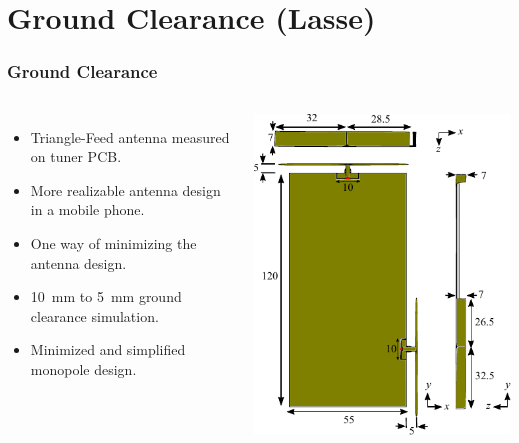 \section[Ground Clearance]{Ground Clearance (Lasse)}
\def\legendfooter{\scriptsize{Upper: Top antenna. Lower: Side antenna. \textcolor{bb}{Monopole Sim}, \textcolor{gg}{Monopole Meas}, \textcolor{rr}{Triangle-Feed Meas}, Frequency in MHz.}}
\def\emptyline{\textcolor{white}{Empty}}

\begin{frame}[fragile]
  \frametitle{Ground Clearance}
  \begin{columns}[onlytextwidth,t]
      \begin{itemize}
      \item Triangle-Feed antenna measured on tuner PCB.
      \item More realizable antenna design in a mobile phone.
      \item One way of minimizing the antenna design.
      \item \SI{10}{mm} to \SI{5}{mm} ground clearance simulation.
      \item Minimized and simplified monopole design.
      \end{itemize}
    \begin{center}
      \includegraphics[scale=0.7]{img/Lasse/3d_drawing_mini.pdf}
    \end{center}
  \end{columns}
\end{frame}

